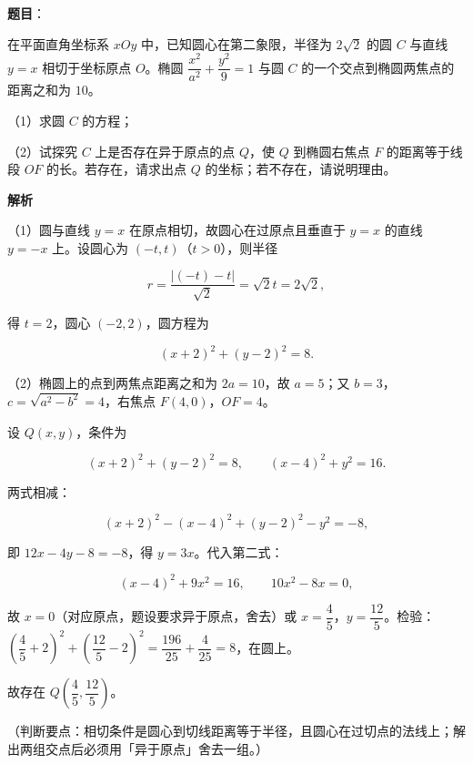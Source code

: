 \begin{answer}

\textbf{题目}：

在平面直角坐标系 $xOy$ 中，已知圆心在第二象限，半径为 $2\sqrt2$ 的圆 $C$ 与直线 $y=x$ 相切于坐标原点 $O$。椭圆 $\dfrac{x^2}{a^2}+\dfrac{y^2}{9}=1$ 与圆 $C$ 的一个交点到椭圆两焦点的距离之和为 $10$。

（1）求圆 $C$ 的方程；

（2）试探究 $C$ 上是否存在异于原点的点 $Q$，使 $Q$ 到椭圆右焦点 $F$ 的距离等于线段 $OF$ 的长。若存在，请求出点 $Q$ 的坐标；若不存在，请说明理由。

\textbf{解析}

（1）圆与直线 $y=x$ 在原点相切，故圆心在过原点且垂直于 $y=x$ 的直线 $y=-x$ 上。设圆心为 $(-t,t)$（$t>0$），则半径

\nopagebreak[4]
\[r=\frac{|(-t)-t|}{\sqrt2}=\sqrt2t=2\sqrt2,\]

得 $t=2$，圆心 $(-2,2)$，圆方程为

\nopagebreak[4]
\[(x+2)^2+(y-2)^2=8.\]

（2）椭圆上的点到两焦点距离之和为 $2a=10$，故 $a=5$；又 $b=3$，$c=\sqrt{a^2-b^2}=4$，右焦点 $F(4,0)$，$OF=4$。

设 $Q(x,y)$，条件为

\nopagebreak[4]
\[(x+2)^2+(y-2)^2=8,\qquad (x-4)^2+y^2=16.\]

两式相减：

\nopagebreak[4]
\[(x+2)^2-(x-4)^2+(y-2)^2-y^2=-8,\]

即 $12x-4y-8=-8$，得 $y=3x$。代入第二式：

\nopagebreak[4]
\[(x-4)^2+9x^2=16,\qquad 10x^2-8x=0,\]

故 $x=0$（对应原点，题设要求异于原点，舍去）或 $x=\dfrac45$，$y=\dfrac{12}{5}$。检验：$\left(\dfrac45+2\right)^2+\left(\dfrac{12}{5}-2\right)^2=\dfrac{196}{25}+\dfrac{4}{25}=8$，在圆上。

故存在 $Q\left(\dfrac45,\dfrac{12}{5}\right)$。

（判断要点：相切条件是圆心到切线距离等于半径，且圆心在过切点的法线上；解出两组交点后必须用「异于原点」舍去一组。）


\end{answer}

